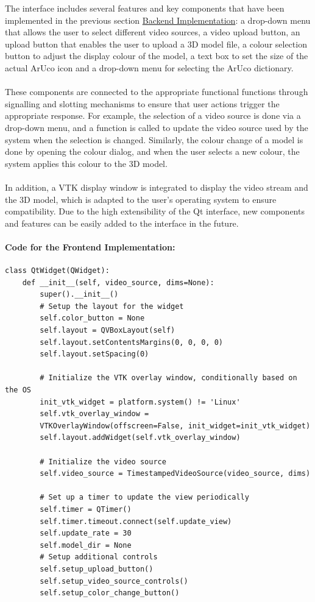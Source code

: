 \documentclass[12pt]{article}
\begin{document}
\begin{enumerate}
      The interface includes several features and key components that have been implemented in the previous section \hyperref[sec:backend]{Backend Implementation}: a drop-down menu that allows the user to select different video sources, a video upload button, an upload button that enables the user to upload a 3D model file, a colour selection button to adjust the display colour of the model, a text box to set the size of the actual ArUco icon and a drop-down menu for selecting the ArUco dictionary.
      \\\\
      These components are connected to the appropriate functional functions through signalling and slotting mechanisms to ensure that user actions trigger the appropriate response\cite{lazar2018mastering}. For example, the selection of a video source is done via a drop-down menu, and a function is called to update the video source used by the system when the selection is changed. Similarly, the colour change of a model is done by opening the colour dialog, and when the user selects a new colour, the system applies this colour to the 3D model.
      \\\\
      In addition, a VTK display window is integrated to display the video stream and the 3D model, which is adapted to the user's operating system to ensure compatibility. Due to the high extensibility of the Qt interface, new components and features can be easily added to the interface in the future.
      
            \paragraph{Code for the Frontend Implementation:}
            \begin{verbatim}
class QtWidget(QWidget):
    def __init__(self, video_source, dims=None):
        super().__init__()
        # Setup the layout for the widget
        self.color_button = None
        self.layout = QVBoxLayout(self)
        self.layout.setContentsMargins(0, 0, 0, 0)
        self.layout.setSpacing(0)

        # Initialize the VTK overlay window, conditionally based on the OS
        init_vtk_widget = platform.system() != 'Linux'
        self.vtk_overlay_window = 
        VTKOverlayWindow(offscreen=False, init_widget=init_vtk_widget)
        self.layout.addWidget(self.vtk_overlay_window)

        # Initialize the video source
        self.video_source = TimestampedVideoSource(video_source, dims)

        # Set up a timer to update the view periodically
        self.timer = QTimer()
        self.timer.timeout.connect(self.update_view)
        self.update_rate = 30
        self.model_dir = None
        # Setup additional controls
        self.setup_upload_button()
        self.setup_video_source_controls()
        self.setup_color_change_button()
            \end{verbatim}
\end{enumerate}
\end{document}
